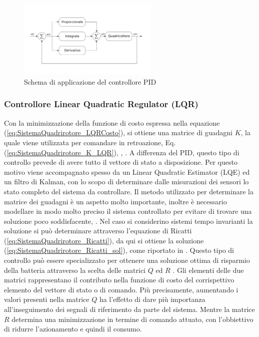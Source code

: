 \begin{figure}
	\centering
	\includegraphics[width=0.6\textwidth]{SistemaQuadrirotore/Figure/PID}
	\caption{Schema di applicazione del controllore PID}
\end{figure}

\subsubsection{Controllore Linear Quadratic Regulator (LQR)}
Con la minimizzazione della funzione di costo espressa nella equazione (\ref{eq:SistemaQuadrirotore_LQRCosto}), si ottiene una matrice di guadagni $K$, la quale viene utilizzata per comandare in retroazione, Eq. (\ref{eq:SistemaQuadrirotore_K_LQR}), \cite{ParaskevopoulosP.N2002MCE}, \cite{6572698}. A differenza del PID, questo tipo di controllo prevede di avere tutto il vettore di stato a disposizione. Per questo motivo viene accompagnato spesso da un Linear Quadratic Estimator (LQE) ed un filtro di Kalman, con lo scopo di determinare dalle misurazioni dei sensori lo stato completo del sistema da controllare. Il metodo utilizzato per determinare la matrice dei guadagni è un aspetto molto importante, inoltre è necessario modellare in modo molto preciso il sistema controllato per evitare di trovare una soluzione poco soddisfacente, \cite{ZuluAndrew2014ARoC}. Nel caso si considerino sistemi tempo invarianti la soluzione si può determinare attraverso l'equazione di Ricatti (\ref{eq:SistemaQuadrirotore_Ricatti}), da qui si ottiene la soluzione (\ref{eq:SistemaQuadrirotore_Ricatti_sol}), come riportato in \cite{baseTesi}. Questo tipo di controllo può essere specializzato per ottenere una soluzione ottima di risparmio della batteria attraverso la scelta delle matrici $Q$ ed $R$ \cite{KoksalN2018ALQA}. Gli elementi delle due matrici rappresentano il contributo nella funzione di costo del corrispettivo elemento del vettore di stato o di comando. Più precisamente, aumentando i valori presenti nella matrice $Q$ ha l'effetto di dare più importanza all'inseguimento dei segnali di riferimento da parte del sistema. Mentre la matrice $R$ determina una minimizzazione in termine di comando attuato, con l'obbiettivo di ridurre l'azionamento e quindi il consumo.

